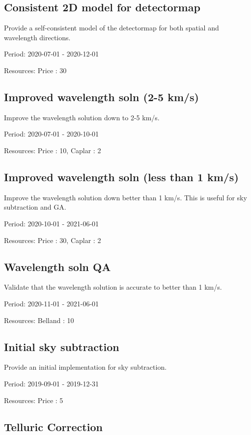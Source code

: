 \subsection{Consistent 2D model for detectormap}

Provide a self-consistent model of the detectormap for both spatial and wavelength directions.

Period: 2020-07-01 - 2020-12-01

Resources: Price : 30

\subsection{Improved wavelength soln (2-5 km/s)}

Improve the wavelength solution down to 2-5 km/s.

Period: 2020-07-01 - 2020-10-01

Resources: Price : 10, Caplar : 2

\subsection{Improved wavelength soln (less than 1 km/s)}

Improve the wavelength solution down better than 1 km/s. This is useful for sky subtraction and GA.

Period: 2020-10-01 - 2021-06-01

Resources: Price : 30, Caplar : 2

\subsection{Wavelength soln QA}

Validate that the wavelength solution is accurate to better than 1 km/s.

Period: 2020-11-01 - 2021-06-01

Resources: Belland : 10

\subsection{Initial sky subtraction}

Provide an initial implementation for sky subtraction.

Period: 2019-09-01 - 2019-12-31

Resources: Price : 5

\subsection{Telluric Correction}


